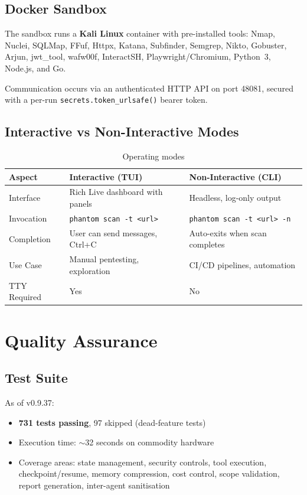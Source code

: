 \documentclass[12pt,a4paper]{report}
\begin{document}
\section{Docker Sandbox}
The sandbox runs a \textbf{Kali Linux} container with pre-installed tools:
Nmap, Nuclei, SQLMap, FFuf, Httpx, Katana, Subfinder, Semgrep, Nikto,
Gobuster, Arjun, jwt\_tool, wafw00f, InteractSH, Playwright/Chromium,
Python~3, Node.js, and Go.

Communication occurs via an authenticated HTTP API on port 48081, secured
with a per-run \texttt{secrets.token\_urlsafe()} bearer token.

\section{Interactive vs Non-Interactive Modes}

\begin{table}[H]
\centering
\caption{Operating modes}
\label{tab:modes}
\begin{tabularx}{\textwidth}{lXX}
\toprule
\textbf{Aspect} & \textbf{Interactive (TUI)} & \textbf{Non-Interactive (CLI)} \\
\midrule
Interface   & Rich Live dashboard with panels & Headless, log-only output \\
Invocation  & \texttt{phantom scan -t <url>} & \texttt{phantom scan -t <url> -n} \\
Completion  & User can send messages, Ctrl+C & Auto-exits when scan completes \\
Use Case    & Manual pentesting, exploration & CI/CD pipelines, automation \\
TTY Required & Yes & No \\
\bottomrule
\end{tabularx}
\end{table}


\chapter{Quality Assurance}
\label{ch:qa}

\section{Test Suite}
As of v0.9.37:
\begin{itemize}[noitemsep]
  \item \textbf{731 tests passing}, 97 skipped (dead-feature tests)
  \item Execution time: $\sim$32 seconds on commodity hardware
  \item Coverage areas: state management, security controls, tool execution,
        checkpoint/resume, memory compression, cost control, scope validation,
        report generation, inter-agent sanitisation
\end{itemize}
\end{document}
